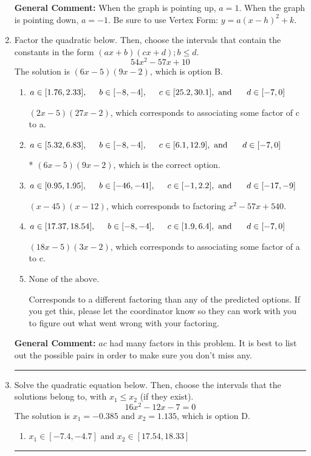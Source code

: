 \documentclass{extbook}[14pt]
\newcommand{\litem}[1]{\item #1

\rule{\textwidth}{0.4pt}}
\begin{document}
\begin{enumerate}
{\textbf{General Comment:} When the graph is pointing up, $a=1$. When the graph is pointing down, $a=-1$. Be sure to use Vertex Form: $y = a(x-h)^2+k$.
}
\litem{
Factor the quadratic below. Then, choose the intervals that contain the constants in the form $(ax+b)(cx+d); b \leq d.$
\[ 54x^{2} -57 x + 10 \]The solution is \( (6x -5)(9x -2) \), which is option B.\begin{enumerate}[label=\Alph*.]
\item \( a \in [1.76, 2.33], \hspace*{5mm} b \in [-8, -4], \hspace*{5mm} c \in [25.2, 30.1], \text{ and } \hspace*{5mm} d \in [-7, 0] \)

 $(2x -5)(27x -2)$, which corresponds to associating some factor of c to a.
\item \( a \in [5.32, 6.83], \hspace*{5mm} b \in [-8, -4], \hspace*{5mm} c \in [6.1, 12.9], \text{ and } \hspace*{5mm} d \in [-7, 0] \)

* $(6x -5)(9x -2)$, which is the correct option.
\item \( a \in [0.95, 1.95], \hspace*{5mm} b \in [-46, -41], \hspace*{5mm} c \in [-1, 2.2], \text{ and } \hspace*{5mm} d \in [-17, -9] \)

 $(x -45)(x -12)$, which corresponds to factoring $x^{2} -57 x + 540$.
\item \( a \in [17.37, 18.54], \hspace*{5mm} b \in [-8, -4], \hspace*{5mm} c \in [1.9, 6.4], \text{ and } \hspace*{5mm} d \in [-7, 0] \)

 $(18x -5)(3x -2)$, which corresponds to associating some factor of a to c.
\item \( \text{None of the above.} \)

 Corresponds to a different factoring than any of the predicted options. If you get this, please let the coordinator know so they can work with you to figure out what went wrong with your factoring.
\end{enumerate}

\textbf{General Comment:} $ac$ had many factors in this problem. It is best to list out the possible pairs in order to make sure you don't miss any.
}
\litem{
Solve the quadratic equation below. Then, choose the intervals that the solutions belong to, with $x_1 \leq x_2$ (if they exist).
\[ 16x^{2} -12 x -7 = 0 \]The solution is \( x_1 = -0.385 \text{ and } x_2 = 1.135 \), which is option D.\begin{enumerate}[label=\Alph*.]
\item \( x_1 \in [-7.4, -4.7] \text{ and } x_2 \in [17.54, 18.33] \)


\end{enumerate}}
\end{enumerate}
\end{document}
